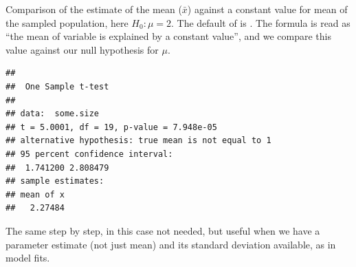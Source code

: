 \documentclass[krantz2]{krantz}\usepackage{knitr}
\begin{document}
\begin{knitrout}\footnotesize
{}\color{fgcolor}\begin{kframe}
\begin{alltt}
 \hlkwb{<-} \hlstd{(} \hlstd{=} \hlstd{(}\hlstd{(}\hlstd{,}  \hlstd{=} \hlstd{),} \hlstd{(}\hlstd{,}  \hlstd{=} \hlstd{)),}
                   \hlstd{=} \hlstd{(}\hlstd{(}\hlstd{(}\hlstd{,} \hlstd{),}  \hlstd{=} \hlstd{)))}
\end{alltt}
\end{kframe}
\end{knitrout}

Comparison of the estimate of the mean ($\bar{x}$) against a constant value for mean of the sampled population, here $H_0: \mu = 2$. The default of  is . The formula  is read as ``the mean of variable  is explained by a constant value'', and we compare this value against our null hypothesis for $\mu$.

\begin{knitrout}\footnotesize
{}\color{fgcolor}\begin{kframe}
\begin{alltt}
 \hlopt{~} \hlstd{,}  \hlstd{=} \hlstd{,}  
\end{alltt}
\begin{verbatim}
## 
## 	One Sample t-test
## 
## data:  some.size
## t = 5.0001, df = 19, p-value = 7.948e-05
## alternative hypothesis: true mean is not equal to 1
## 95 percent confidence interval:
##  1.741200 2.808479
## sample estimates:
## mean of x 
##   2.27484
\end{verbatim}
\end{kframe}
\end{knitrout}

The same step by step, in this case not needed, but useful when we have a parameter estimate (not just mean) and its standard deviation available, as in model fits.
\end{document}
